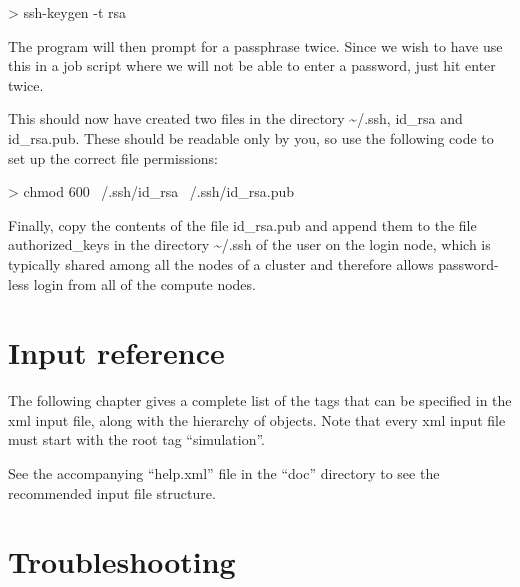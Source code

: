 \documentclass[11pt,english,fleqn]{report}
\newenvironment{code}{%
\footnotesize 
\verbatim
}{
\endverbatim
\normalsize
}
\begin{document}
\begin{code}
> ssh-keygen -t rsa
\end{code}

The program will then prompt for a passphrase twice. Since we wish to have
use this in a job script where we will not be able to enter a password,
just hit enter twice. 

This should now have created two files in the directory \textasciitilde{}/.ssh,
id\_rsa and id\_rsa.pub. These should be readable only by you, so
use the following code to set up the correct file permissions:

\begin{code}
> chmod 600 ~/.ssh/id_rsa ~/.ssh/id_rsa.pub
\end{code}

Finally, copy the contents of the file id\_rsa.pub and append them
to the file authorized\_keys in the directory \textasciitilde{}/.ssh
of the user on the login node, which is typically shared among all
the nodes of a cluster and therefore allows password-less login 
from all of the compute nodes.


\chapter{Input reference}

\label{hierarchy}

The following chapter gives a complete list of the tags that can be
specified in the xml input file, along with the hierarchy of objects.
Note that every xml input file must start with the root tag {}``simulation''. 

See the accompanying {}``help.xml'' file in the {}``doc'' directory
to see the recommended input file structure.



























\chapter{Troubleshooting}
\end{document}
